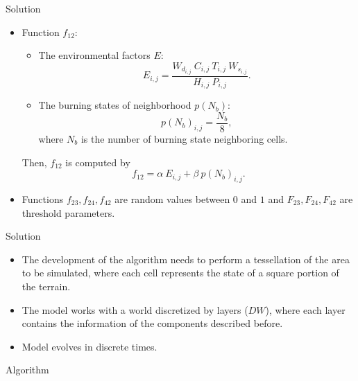 \documentclass{beamer}
\begin{document}
      \begin{frame}{Solution}
        \begin{itemize}
          \item Function $f_{12}$:
            \begin{itemize}
              \item The environmental factors $E$:
                \begin{equation}
                  E_{i,j} = \frac{W_{d_{i,j}} ~ C_{i,j} ~ T_{i,j} ~ W_{s_{i,j}}}{H_{i,j} ~ P_{i,j}}.
                \end{equation}
              \item The burning states of neighborhood $p(N_b)$:
                \begin{equation}
                  p(N_b)_{i,j} = \frac{N_b}{8},
                \end{equation}
                where $N_b$ is the number of burning state neighboring cells.
            \end{itemize}
            Then, $f_{12}$ is computed by
            \begin{equation}
              f_{12} = \alpha ~ E_{i,j} + \beta ~ p(N_b)_{i,j}.
            \end{equation}
          \item Functions $f_{23}, f_{24}, f_{42}$ are random values between $0$ and $1$ 
            and $F_{23}, F_{24}, F_{42}$ are threshold parameters.
        \end{itemize}
      \end{frame}            
          
      \begin{frame}{Solution}
        \begin{itemize}
          \item<1-> The development of the algorithm needs to perform a tessellation of the area 
            to be simulated, where each cell represents the state of a square portion of the terrain. 
          \item<2-> The model works with a world discretized by layers ($DW$), where each layer contains 
            the information of the components described before.
          \item<3-> Model evolves in discrete times.
        \end{itemize}
      \end{frame}
      
      \begin{frame}{Algorithm}
        \begin{algorithm}[H]
          \begin{algorithmic}
            \EndFor
          \end{algorithmic}
          \caption{Main Algorithm}
          \label{alg:main}
        \end{algorithm}
      \end{frame}
      
\end{document}
